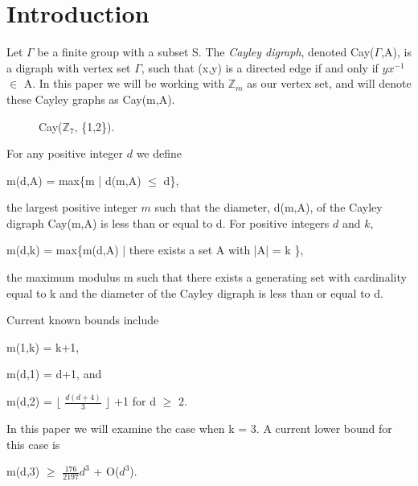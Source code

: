 \section{Introduction}

Let $\Gamma$ be a finite group with a subset S. The \emph{Cayley digraph}, denoted Cay($\Gamma$,A), is a digraph with vertex set $\Gamma$, such that (x,y) is a directed edge if and only if $yx^{-1}$ $\in$ A.
In this paper we will be working with $\mathbb{Z}_m$ as our vertex set, and will denote these Cayley graphs as Cay(m,A). 

 
\begin{figure}[h]
\begin{center}

\end{center}
\caption{ Cay($\mathbb{Z}_7$, \{1,2\}).}
\end{figure}

For any positive integer $d$ we define

\begin{center}
m(d,A) = max\{m | d(m,A) $\leq$ d\},
\end{center}
the largest positive integer $m$ such that the diameter, d(m,A), of the Cayley digraph Cay(m,A) is less than or equal to d. For positive integers $d$ and $k$, 
\begin{center}
m(d,k) = max\{m(d,A) | there exists a set A with |A| = k \},
\end{center}
the maximum modulus m such that there exists a generating set with cardinality equal to k and the diameter of the Cayley digraph is less than or equal to d. 

Current known bounds include
\begin{center}
m(1,k) = k+1,
\end{center}

\begin{center}
m(d,1) = d+1, and
\end{center}

\begin{center}
m(d,2) = $\lfloor$ $\frac{d(d+4)}{3}$ $\rfloor$ +1 for d $\geq$ 2. 
\end{center}

In this paper we will examine the case when k = 3. A current lower bound for this case is 
\begin{center}
m(d,3) $\geq$ $\frac{176}{2197}$$d^3$ + O($d^3$). 
\end{center}





